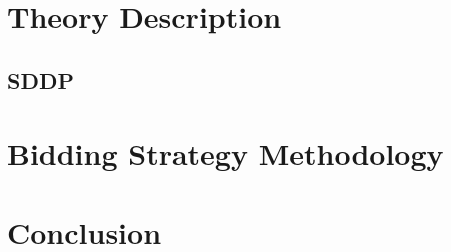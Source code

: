 \documentclass[journal]{IEEEtran} %
\begin{document}
\section{Theory Description}
\subsection{SDDP}

\section{Bidding Strategy Methodology}
\newpage








\section{Conclusion}


















\ifCLASSOPTIONcaptionsoff
  \newpage
\fi




\end{document}
